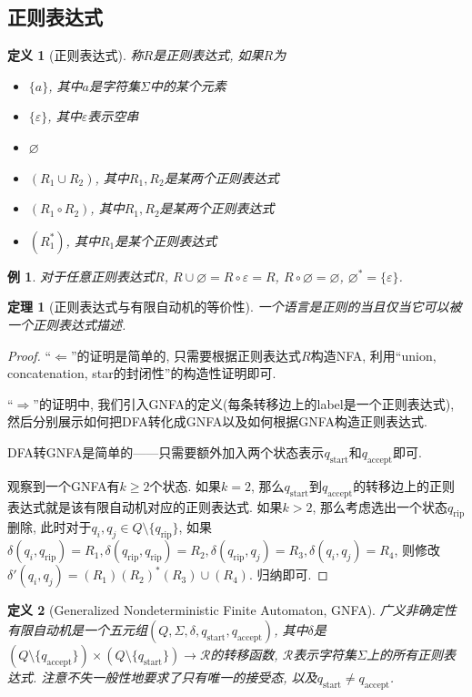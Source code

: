 \documentclass[8pt]{article}
\theoremstyle{compact}
\newtheorem{theorem}{定理}[section]
\newtheorem{definition}{定义}[section]
\newtheorem{example}{例}[section]
\def\ge{\geqslant}
\begin{document}
\subsection{正则表达式}
\begin{definition}[正则表达式]
	称$R$是正则表达式, 如果$R$为
	\begin{itemize}
		\item $\{a\}$, 其中$a$是字符集$\Sigma$中的某个元素
		\item $\{\varepsilon\}$, 其中$\varepsilon$表示空串
		\item $\varnothing$
		\item $(R_1 \cup R_2)$, 其中$R_1, R_2$是某两个正则表达式
		\item $(R_1 \circ R_2)$, 其中$R_1, R_2$是某两个正则表达式
		\item $(R_1^*)$, 其中$R_1$是某个正则表达式
	\end{itemize}
\end{definition}
\begin{example}
	对于任意正则表达式$R$, $R \cup \varnothing = R \circ \varepsilon = R$, $R \circ \varnothing = \varnothing$, $\varnothing^* = \{\varepsilon\}$. 
\end{example}
\begin{theorem}[正则表达式与有限自动机的等价性]
	一个语言是正则的当且仅当它可以被一个正则表达式描述. 
\end{theorem}
\begin{proof}
	“$\Leftarrow$”的证明是简单的, 只需要根据正则表达式$R$构造NFA, 利用“union, concatenation, star的封闭性”的构造性证明即可. 

	“$\Rightarrow$”的证明中, 我们引入GNFA的定义(每条转移边上的label是一个正则表达式), 然后分别展示如何把DFA转化成GNFA以及如何根据GNFA构造正则表达式. 

	DFA转GNFA是简单的——只需要额外加入两个状态表示$q_{\text{start}}$和$q_{\text{accept}}$即可. 

	观察到一个GNFA有$k \ge 2$个状态. 如果$k=2$, 那么$q_{\text{start}}$到$q_{\text{accept}}$的转移边上的正则表达式就是该有限自动机对应的正则表达式. 如果$k > 2$, 那么考虑选出一个状态$q_{\text{rip}}$删除, 此时对于$q_i, q_j \in Q \setminus \{q_{\text{rip}}\}$, 如果$\delta(q_i,  q_{\text{rip}}) = R_1, \delta(q_{\text{rip}}, q_{\text{rip}}) = R_2, \delta(q_{\text{rip}}, q_j) = R_3, \delta(q_i, q_j) = R_4$, 则修改$\delta'(q_i, q_j) = (R_1)(R_2)^*(R_3) \cup (R_4)$. 归纳即可. 
\end{proof}
\begin{definition}[Generalized Nondeterministic Finite Automaton, GNFA]
	广义非确定性有限自动机是一个五元组$(Q, \Sigma, \delta, q_{\text{start}}, q_{\text{accept}})$, 其中$\delta$是$(Q \setminus \{q_{\text{accept}}\}) \times (Q \setminus \{q_{\text{start}}\}) \to \mathcal R$的转移函数, $\mathcal R$表示字符集$\Sigma$上的所有正则表达式. 注意不失一般性地要求了只有唯一的接受态, 以及$q_{\text{start}} \neq q_{\text{accept}}$. 
\end{definition}
\end{document}
